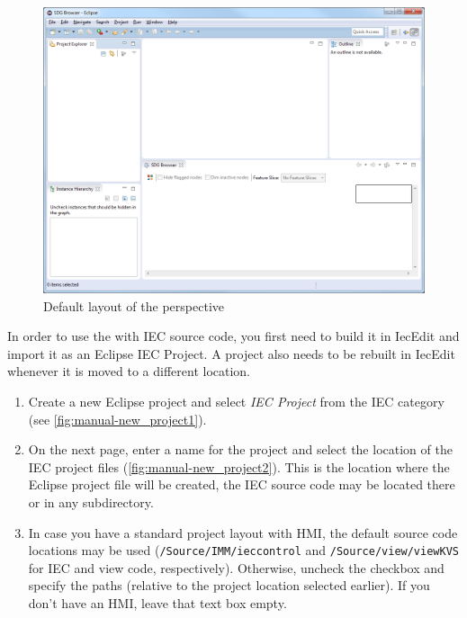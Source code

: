 \begin{figure}[htp]
  \centering
    \includegraphics[width=\textwidth]{bilder/manual-perspective}
  \caption{Default layout of the \emph{\SB} perspective}
  \label{fig:manual-perspective}
\end{figure}

In order to use the \SB with IEC source code, you first need to build it in IecEdit and import it as an Eclipse IEC 
Project. A project also needs to be rebuilt in IecEdit whenever it is moved to a different location.

\begin{enumerate}
  \item Create a new Eclipse project and select \emph{IEC Project} from the IEC category (see 
  \autoref{fig:manual-new_project1}).
  
  \item On the next page, enter a name for the project and select the location of the IEC project files 
  (\autoref{fig:manual-new_project2}). This is the location where the Eclipse project file will be created, the IEC 
  source code may be located there or in any subdirectory.
  
  \item In case you have a standard project layout with HMI, the default source code locations may be used 
  (\texttt{/Source/IMM/ieccontrol} and \texttt{/Source/view/viewKVS} for IEC and view code, respectively). Otherwise, 
  uncheck the checkbox and specify the paths (relative to the project location selected earlier). If you don't have an 
  HMI, leave that text box empty.
\end{enumerate}

